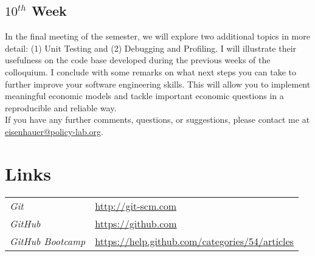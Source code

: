 \subsection*{$10^{th}$ Week} 
In the final meeting of the semester, we will explore two additional topics in more detail: (1) Unit Testing and (2) Debugging and Profiling. I will illustrate their usefulness on the code base developed during the previous weeks of the colloquium. I conclude with some remarks on what next steps you can take to further improve your software engineering skills. This will allow you to implement meaningful economic models and tackle important economic questions in a reproducible and reliable way.\\\newline
\noindent If you have any further comments, questions, or suggestions, please contact me at \href{mailto: eisenhauer@policy-lab.org}{eisenhauer@policy-lab.org}.

\newpage



\section*{Links}\vspace{0.5cm}

\begin{tabular}{ll}
\textit{Git}    & \url{http://git-scm.com}\\ [1ex]
\textit{GitHub} & \url{https://github.com}\\ [1ex]
\textit{GitHub Bootcamp} & \url{https://help.github.com/categories/54/articles}\\ [1ex]
\end{tabular}

\nocite{Wilson.2014,Eisenhauer.2014}





